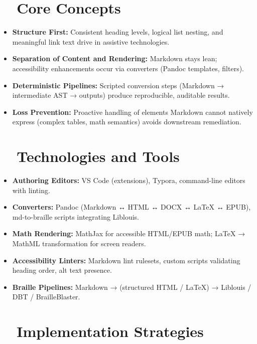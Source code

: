 \section{~~Core Concepts}\label{ch19:sec:core-concepts}
\begin{itemize}
	\item \textbf{Structure First:} Consistent heading levels, logical list nesting, and meaningful link text drive  in assistive technologies.
	\item \textbf{Separation of Content and Rendering:} Markdown stays lean; accessibility enhancements occur via converters (Pandoc templates, filters).
	\item \textbf{Deterministic Pipelines:} Scripted conversion steps (Markdown → intermediate AST → outputs) produce reproducible, auditable results.
	\item \textbf{Loss Prevention:} Proactive handling of elements Markdown cannot natively express (complex tables, math semantics) avoids downstream remediation.
\end{itemize}

\section{~~Technologies and Tools}\label{ch19:sec:technologies-tools}
\begin{itemize}
	\item \textbf{Authoring Editors:} VS Code (extensions), Typora, command-line editors with linting.
	\item \textbf{Converters:} Pandoc\supercite{Pandoc} (Markdown ↔ HTML ↔ DOCX ↔ LaTeX ↔ EPUB), md-to-braille scripts integrating Liblouis.
	\item \textbf{Math Rendering:} MathJax\supercite{MathJax} for accessible HTML/EPUB math; LaTeX → MathML transformation for screen readers.
	\item \textbf{Accessibility Linters:} Markdown lint rulesets, custom scripts validating heading order, alt text presence.
	\item \textbf{Braille Pipelines:} Markdown → (structured HTML / LaTeX) → Liblouis / DBT / BrailleBlaster\supercite{BrailleProcess}.
\end{itemize}

\section{~~Implementation Strategies}\label{ch19:sec:implementation-strategies}
